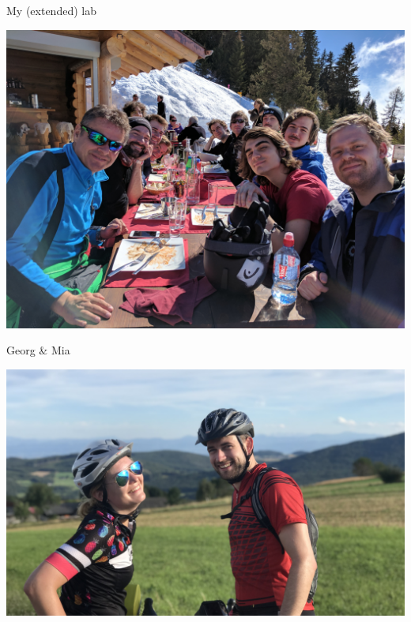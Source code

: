 \documentclass[10pt]{beamer}
\newenvironment{slide}[2][]
  {\begin{frame}[fragile,environment=slide,#1]{#2}}
  {\end{frame}}
\begin{document}
\begin{slide}{My (extended) lab}
\begin{center}
\includegraphics[width=\textwidth]{figures/ski-trip.jpg}
\end{center}
\end{slide}

\begin{slide}{Georg \& Mia}
\begin{center}
\includegraphics[width=\textwidth]{figures/bike-trip.jpg}
\end{center}
\end{slide}
\end{document}
